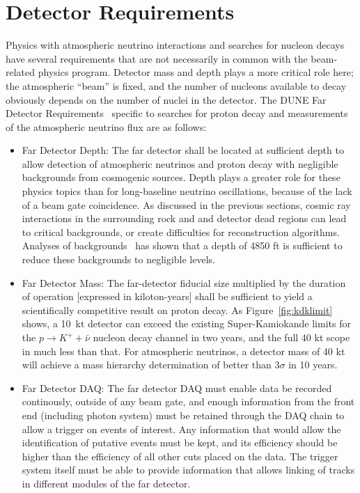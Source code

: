 \section{Detector Requirements}
\label{sec:physics-atmpdk-detector-requirements}

Physics with atmospheric neutrino interactions and searches for
nucleon decays have several requirements that are not necessarily in
common with the beam-related physics program.  Detector mass and depth plays a
more critical role here; the atmospheric ``beam'' is fixed, and the
number of nucleons available to decay obviously depends on the number
of nuclei in the detector.  The DUNE Far Detector
Requirements~\cite{lbnfdune-cdr-req} specific to searches for proton
decay and measurements of the atmospheric neutrino flux are as
follows:

\begin{itemize}

\item Far Detector Depth: The far detector shall be located at
  sufficient depth to allow detection of atmospheric neutrinos and
  proton decay with negligible backgrounds from cosmogenic sources.
  Depth plays a greater role for these physics topics than for
  long-baseline neutrino oscillations, because of the lack of a beam
  gate coincidence. As discussed in the previous sections, cosmic ray
  interactions in the surrounding rock and and detector dead regions
  can lead to critical backgrounds, or create difficulties for
  reconstruction algorithms. Analyses of
  backgrounds~\cite{Bueno:2007um, Klinger:2015kva, Adams:2013qkq} has
  shown that a depth of 4850 ft is sufficient to reduce these
  backgrounds to negligible levels.

\item Far Detector Mass: The far-detector fiducial size multiplied by
  the duration of operation [expressed in kiloton-years] shall be
  sufficient to yield a scientifically competitive result on proton
  decay. As Figure~\ref{fig:kdklimit} shows, a 10~kt detector can
  exceed the existing Super-Kamiokande limits for the $p\rightarrow
  K^+ + \bar{\nu}$ nucleon decay channel in two years, and the full 40
  kt scope in much less than that.  For atmospheric neutrinos, a
  detector mass of 40 kt will achieve a mass hierarchy determination
  of better than 3$\sigma$ in 10 years.

\item Far Detector DAQ: The far detector DAQ must enable data be
  recorded continously, outside of any beam gate, and enough
  information from the front end (including photon system) must be retained
  through the DAQ chain to allow a trigger on events of interest. Any
  information that would allow the identification of putative events
  must be kept, and its efficiency should be higher than the
  efficiency of all other cuts placed on the data.  The trigger system
  itself must be able to provide information that allows linking of
  tracks in different modules of the far detector.


\end{itemize}
